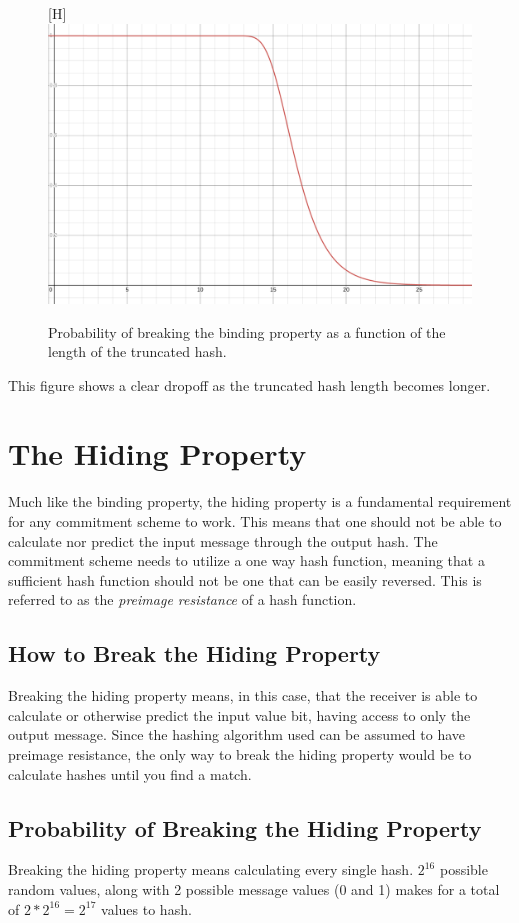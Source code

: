 \documentclass[a4paper,11pt]{article}
\begin{document}
\begin{figure}
  \begin{center}[H]
    \includegraphics[width=0.7\linewidth]{binding.png}
    \caption{Probability of breaking the binding property as a function of the length of the truncated hash.}
    \label{fig:binding}
  \end{center}
\end{figure}

This figure shows a clear dropoff as the truncated hash length becomes longer.

\section{The Hiding Property}
Much like the binding property, the hiding property is a fundamental requirement for any commitment scheme to work. This means that one should not be able to calculate nor predict the input message through the output hash. The commitment scheme needs to utilize a one way hash function, meaning that a sufficient hash function should not be one that can be easily reversed. This is referred to as the \textit{preimage resistance} of a hash function.

\subsection{How to Break the Hiding Property}
Breaking the hiding property means, in this case, that the receiver is able to calculate or otherwise predict the input value bit, having access to only the output message. Since the hashing algorithm used can be assumed to have preimage resistance, the only way to break the hiding property would be to calculate hashes until you find a match.

\subsection{Probability of Breaking the Hiding Property}
Breaking the hiding property means calculating every single hash. $ 2^{16} $ possible random values, along with 2 possible message values (0 and 1) makes for a total of 
$ 2 * 2^{16} = 2^{17} $ values to hash.
\end{document}
